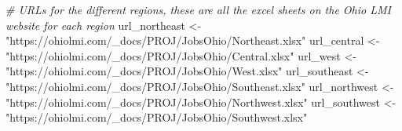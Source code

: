 \documentclass[
]{article}
\newenvironment{Shaded}{\begin{snugshade}}{\end{snugshade}}
\newcommand{\CommentTok}[1]{\textcolor[rgb]{0.56,0.35,0.01}{\textit{#1}}}
\newcommand{\NormalTok}[1]{#1}
\newcommand{\OtherTok}[1]{\textcolor[rgb]{0.56,0.35,0.01}{#1}}
\newcommand{\StringTok}[1]{\textcolor[rgb]{0.31,0.60,0.02}{#1}}
\begin{document}
\begin{Shaded}
\begin{Highlighting}[]
\CommentTok{\# URLs for the different regions, these are all the excel sheets on the Ohio LMI website for each region}
\NormalTok{url\_northeast }\OtherTok{\textless{}{-}} \StringTok{"https://ohiolmi.com/\_docs/PROJ/JobsOhio/Northeast.xlsx"}
\NormalTok{url\_central }\OtherTok{\textless{}{-}} \StringTok{"https://ohiolmi.com/\_docs/PROJ/JobsOhio/Central.xlsx"}
\NormalTok{url\_west }\OtherTok{\textless{}{-}} \StringTok{"https://ohiolmi.com/\_docs/PROJ/JobsOhio/West.xlsx"}
\NormalTok{url\_southeast }\OtherTok{\textless{}{-}} \StringTok{"https://ohiolmi.com/\_docs/PROJ/JobsOhio/Southeast.xlsx"}
\NormalTok{url\_northwest }\OtherTok{\textless{}{-}} \StringTok{"https://ohiolmi.com/\_docs/PROJ/JobsOhio/Northwest.xlsx"}
\NormalTok{url\_southwest }\OtherTok{\textless{}{-}} \StringTok{"https://ohiolmi.com/\_docs/PROJ/JobsOhio/Southwest.xlsx"}




\end{Highlighting}
\end{Shaded}
\end{document}
